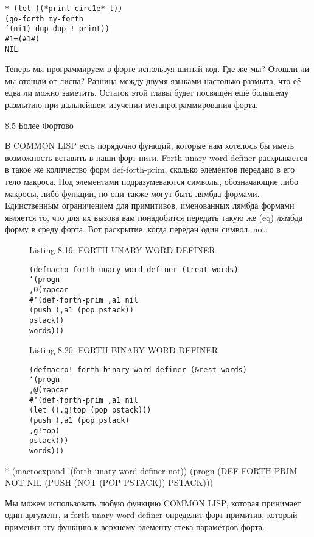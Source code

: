 {{{\begin{verbatim}
* (let ((*print-circ1e* t))
(go-forth my-forth
’(ni1) dup dup ! print))
#1=(#1#)
NIL
\end{verbatim}

Теперь мы программируем в форте используя шитый код. Где же мы? Отошли ли мы отошли от лиспа? Разница между двумя языками настолько размыта, что её едва ли можно заметить. Остаток этой главы будет посвящён ещё большему размытию при дальнейшем изучении метапрограммирования форта.

8.5 Более Фортово

В COMMON LISP есть порядочно функций, которые нам хотелось бы иметь возможность вставить в наши форт нити. Forth-unary-word-definer раскрывается в такое же количество форм def-forth-prim, сколько элементов передано в его тело макроса. Под элементами подразумеваются символы,  обозначающие либо макросы, либо функции, но они также могут быть лямбда формами. Единственным ограничением для примитивов, именованных лямбда формами является то, что для их вызова вам понадобится передать такую же (eq) лямбда форму в среду форта. Вот раскрытие, когда передан один символ, not: 

\begin{figure}Listing 8.19: FORTH-UNARY-WORD-DEFINER\label{listing_8.19}
\listbegin
\begin{verbatim}
(defmacro forth-unary-word-definer (treat words)
‘(progn
,O(mapcar
#‘(def-forth-prim ,a1 nil
(push (,a1 (pop pstack))
pstack))
words)))
\end{verbatim}
\listend
\end{figure}

\begin{figure}Listing 8.20: FORTH-BINARY-WORD-DEFINER\label{listing_8.20}
\listbegin
\begin{verbatim}
(defmacro! forth-binary-word-definer (&rest words)
‘(progn
,@(mapcar
#‘(def-forth-prim ,a1 nil
(let ((.g!top (pop pstack)))
(push (,a1 (pop pstack)
,g!top)
pstack)))
words)))
\end{verbatim}
\listend
\end{figure}

* (macroexpand
’(forth-unary-word-definer
not))
(progn
(DEF-FORTH-PRIM NOT NIL
(PUSH (NOT (POP PSTACK))
PSTACK)))

Мы можем использовать любую функцию COMMON LISP, которая принимает один аргумент, и forth-unary-word-definer определит форт примитив, который применит эту функцию к верхнему элементу стека параметров форта.

}}}
